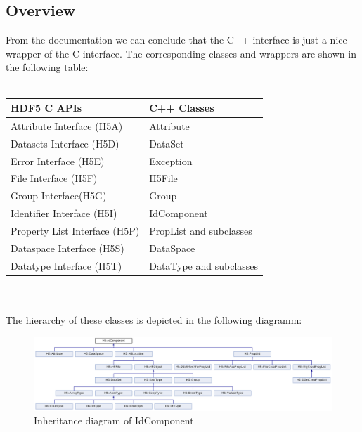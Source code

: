 \documentclass{article}
\begin{document}
\subsection{Overview}
From the documentation we can conclude that the C++ interface is just a nice wrapper of the C interface. The corresponding classes and wrappers are shown in the following table:\\
\\
\begin{tabular}{|l|l|}
\hline
HDF5 C APIs&C++ Classes\\
\hline
Attribute Interface (H5A)&Attribute\\
Datasets Interface (H5D)&DataSet\\
Error Interface (H5E)&Exception\\
File Interface (H5F)&H5File\\
Group Interface(H5G)&Group\\
Identifier Interface (H5I)&IdComponent\\
Property List Interface (H5P)&PropList and subclasses\\
Dataspace Interface (H5S)&DataSpace\\
Datatype Interface (H5T)&DataType and subclasses\\
\hline
\end{tabular}\\
\\
The hierarchy of these classes is depicted in the following diagramm:\\
\begin{figure}[H]
\includegraphics[width=1.2\textwidth]{inheritance_diagramm.png}
\caption{Inheritance diagram of IdComponent}
\end{figure}
\end{document}
